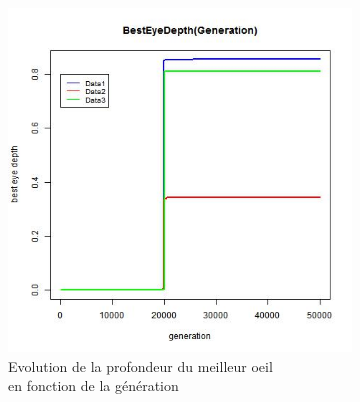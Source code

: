 \documentclass[a4paper,11pt]{article}
\begin{document}
\begin{figure}
\begin{subfigure}{.5\textwidth}
\includegraphics[width=1\linewidth]{best_eye_depth.jpeg}
\caption{Evolution de la profondeur du meilleur oeil \\en fonction de la génération}
\label{fig:best_4}
\end{subfigure}
\caption{}
\label{fig:test}
\end{figure}

%
\end{document}
